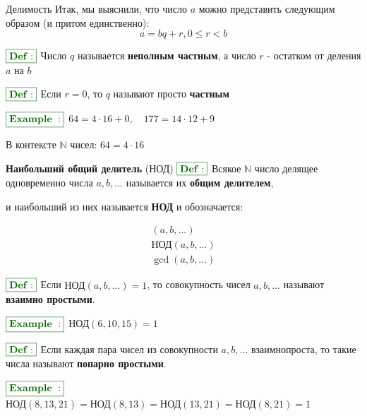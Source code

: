 \documentclass[8pt, aspectratio=169]{beamer}
\newcommand{\Def}{{\color{darkgreen}\boxed{\color{darkgreen}\mathbf{Def:}}}}
\newcommand{\Ex}[1]{{\color{darkgreen}\boxed{\color{darkgreen}\mathbf{Example~#1:}}}}
\begin{document}
\begin{frame}{Делимость}
Итак, мы выяснили, что число $a$ можно представить следующим образом (и притом единственно):
\[
a = bq + r, 0 \le r < b
\]

$\Def$ Число $q$ называется \textbf{неполным частным}, а число $r$ - остатком от деления $a$ на $b$

$\Def$ Если $r = 0$, то $q$ называют просто \textbf{частным}

$\Ex{}$ $64 = 4\cdot 16 + 0, \quad 177 = 14 \cdot 12 + 9$

В контексте $\mathbb{N}$ чисел: $64 = 4\cdot 16$
\end{frame}

\begin{frame}{\textbf{Наибольший общий делитель} (НОД)}
$\Def$ Всякое $\mathbb{N}$ число делящее одновременно числа $a, b, ... $ называется их \textbf{общим делителем},

и наибольший из них называется \textbf{НОД} и обозначается:

\begin{gather*}
(a, b, ...) \\
\text{НОД}(a, b, ...) \\
\gcd(a, b, ...)
\end{gather*}

$\Def$ Если $\text{НОД}(a, b, ...) = 1$, то совокупность чисел $a, b, ...$ называют \textbf{взаимно простыми}.

$\Ex{}$ $\text{НОД}(6, 10, 15) = 1$

$\Def$ Если каждая пара чисел из совокупности $a, b, ...$ взаимнопроста, то такие числа называют \textbf{попарно простыми}.

$\Ex{}$ $\text{НОД}(8, 13, 21) = \text{НОД}(8, 13) = \text{НОД}(13, 21) = \text{НОД}(8, 21) = 1$

\end{frame}
\end{document}
